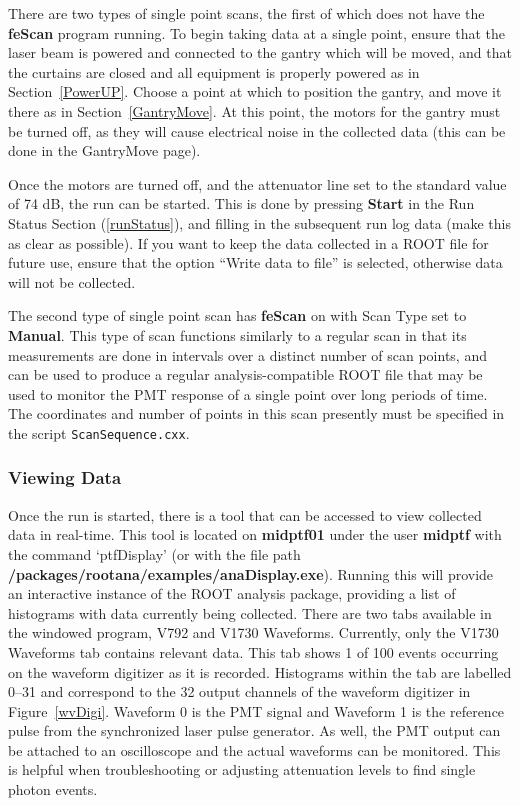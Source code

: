 \documentclass[twoside,letterpaper]{refart}
\begin{document}
There are two types of single point scans, the first of which does not have the \textbf{feScan} program running. To begin taking data at a single point, ensure that the laser beam is powered and connected to the gantry which will be moved, and that the curtains are closed and all equipment is properly powered as in Section~\ref{PowerUP}. Choose a point at which to position the gantry, and move it there as in Section~\ref{GantryMove}. At this point, the motors for the gantry must be turned off, as they will cause electrical noise in the collected data (this can be done in the GantryMove page).

Once the motors are turned off, and the attenuator line set to the standard value of 74 dB, the run can be started. This is done by pressing \textbf{Start} in the Run Status Section (\ref{runStatus}), and filling in the subsequent run log data (make this as clear as possible). If you want to keep the data collected in a ROOT file for future use, ensure that the option ``Write data to file'' is selected, otherwise data will not be collected.

The second type of single point scan has \textbf{feScan} on with Scan Type set to \textbf{Manual}. This type of scan functions similarly to a regular scan in that its measurements are done in intervals over a distinct number of scan points, and can be used to produce a regular analysis-compatible ROOT file that may be used to monitor the PMT response of a single point over long periods of time. The coordinates and number of points in this scan presently must be specified in the script \texttt{ScanSequence.cxx}.

\subsubsection{Viewing Data}

Once the run is started, there is a tool that can be accessed to view collected data in real-time. This tool is located on \textbf{midptf01} under the user \textbf{midptf} with the command `ptfDisplay' (or with the file path \textbf{/packages/rootana/examples/anaDisplay.exe}). Running this will provide an interactive instance of the ROOT analysis package, providing a list of histograms with data currently being collected.
There are two tabs available in the windowed program, V792 and V1730 Waveforms. Currently, only the V1730 Waveforms tab contains relevant data. This tab shows 1 of 100 events occurring on the waveform digitizer as it is recorded. Histograms within the tab are labelled 0--31 and correspond to the 32 output channels of the waveform digitizer in Figure~\ref{wvDigi}. Waveform 0 is the PMT signal and Waveform 1 is the reference pulse from the synchronized laser pulse generator. As well, the PMT output can be attached to an oscilloscope and the actual waveforms can be monitored. This is helpful when troubleshooting or adjusting attenuation levels to find single photon events.
\end{document}
